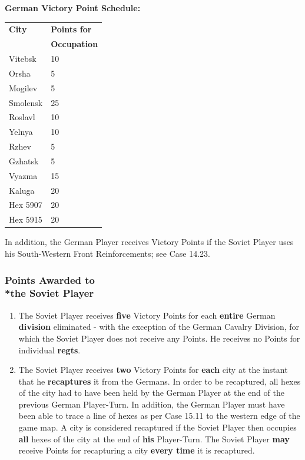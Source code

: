 \noindent\begin{minipage}{\dimexpr\linewidth-30pt\relax}
\small
\textbf{German Victory Point Schedule:}

\begin{tabular}{l@{\hskip 1.2in}l}
  \textbf{City} & \textbf{Points for}\\
  & \textbf{Occupation}\\
  Vitebsk & 10\\
  Orsha & 5\\
  Mogilev & 5\\
  Smolensk & 25\\
  Roslavl & 10\\
  Yelnya & 10\\
  Rzhev & 5\\
  Gzhatsk & 5\\
  Vyazma & 15\\
  Kaluga & 20\\
  Hex 5907 & 20\\
  Hex 5915 & 20
\end{tabular}
\end{minipage}

In addition, the German Player receives Victory Points if the Soviet Player uses his South-Western Front Reinforcements; see Case 14.23.

\subsubsection{Points Awarded to\\*the Soviet Player}

\begin{enumerate}
  \item The Soviet Player receives \textbf{five} Victory Points for each \textbf{entire} German \textbf{division} eliminated - with the exception of the German Cavalry Division, for which the Soviet Player does not receive any Points. He receives no Points for individual \textbf{regts}.
  \item The Soviet Player receives \textbf{two} Victory Points for \textbf{each} city at the instant that he \textbf{recaptures} it from the Germans. In order to be recaptured, all hexes of the city had to have been held by the German Player at the end of the previous German Player-Turn. In addition, the German Player must have been able to trace a line of hexes as per Case 15.11 to the western edge of the game map. A city is considered recaptured if the Soviet Player then occupies \textbf{all} hexes of the city at the end of \textbf{his} Player-Turn. The Soviet Player \textbf{may} receive Points for recapturing a city \textbf{every time} it is recaptured.
\end{enumerate}

